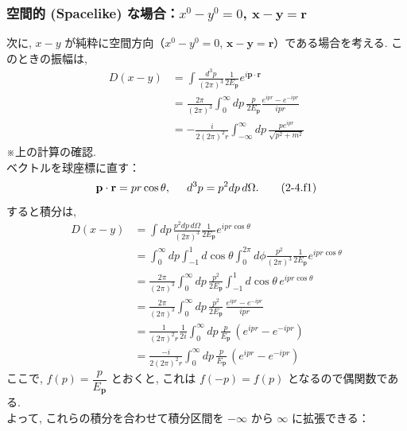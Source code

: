 \documentclass[a4paper,12pt]{article}
\begin{document}
\subsubsection*{空間的 (Spacelike) な場合：$x^0 - y^0 = 0$, $\mathbf{x} - \mathbf{y} = \mathbf{r}$}
次に, $x - y$ が純粋に空間方向（$x^0 - y^0 = 0$, $\mathbf{x} - \mathbf{y} = \mathbf{r}$）である場合を考える. このときの振幅は,
\begin{align*}
D(x - y) &= \int \frac{d^3 p}{(2\pi)^3} \frac{1}{2E_{\mathbf{p}}} e^{i \mathbf{p} \cdot \mathbf{r}} \\
&= \frac{2\pi}{(2\pi)^3} \int_0^\infty dp \, \frac{p}{2E_{\mathbf{p}}} \frac{e^{ipr} - e^{-ipr}}{ipr} \\
&= -\frac{i}{2(2\pi)^2 r} \int_{-\infty}^\infty dp \, \frac{p e^{ipr}}{\sqrt{p^2 + m^2}}
\end{align*}
\color{blue}
※上の計算の確認.\\
ベクトルを球座標に直す：
\begin{equation*}
  \mathbf{p}\cdot \mathbf{r} = pr \cos \theta, \hspace{0.5cm} d^3 p = p^2 dp\, d\Omega. \tag{2-4.f1}
\end{equation*}
すると積分は,
\begin{align*}
  D(x - y) &= \int dp \, \frac{p^2 dp\, d\Omega}{(2\pi)^3} \frac{1}{2E_{\mathbf{p}}} e^{ipr \cos \theta} \tag{2-4.f2}\\
  &= \int_{0}^{\infty} dp \int_{-1}^{1} d\cos \theta \int_{0}^{2\pi} d\phi \frac{p^2}{(2\pi)^3} \frac{1}{2E_{\mathbf{p}}} e^{ipr \cos \theta} \tag{2-4.f3}\\
  &= \frac{2\pi}{(2\pi)^3} \int_{0}^{\infty} dp\, \frac{p^2}{2E_{\mathbf{p}}} \int_{-1}^{1} d\cos \theta\, e^{ipr \cos \theta} \tag{2-4.f4}\\
  &= \frac{2\pi}{(2\pi)^3} \int_{0}^{\infty} dp\, \frac{p^2}{2E_{\mathbf{p}}}\, \frac{e^{ipr} - e^{-ipr}}{ipr} \tag{2-4.f5}\\
  &= \frac{1}{(2\pi)^2 r}\frac{1}{2 i} \int_{0}^{\infty} dp\, \frac{p}{E_{\mathbf{p}}}\, (e^{ipr} - e^{-ipr}) \tag{2-4.f6}\\
  &= \frac{-i}{2(2\pi)^2 r} \int_{0}^{\infty} dp\, \frac{p}{E_{\mathbf{p}}}\, (e^{ipr} - e^{-ipr}) \tag{2-4.f7}
\end{align*}
ここで, $f(p) = \dfrac{p}{E_{\mathbf{p}}}$ とおくと, これは $f(-p) = f(p)$ となるので偶関数である.\\
よって, これらの積分を合わせて積分区間を $-\infty$ から $\infty$ に拡張できる：
\end{document}
